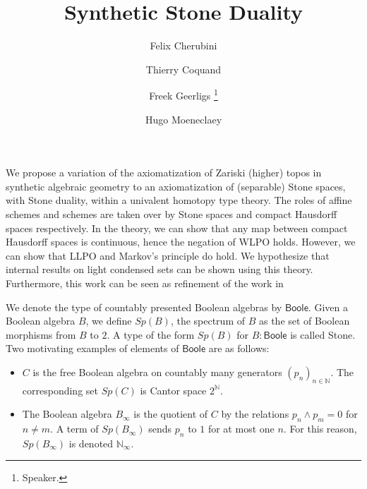 \documentclass[letterpaper]{../../util/easychair}
\title{Synthetic Stone Duality 
}
\author{
Felix Cherubini %
\and 
 Thierry Coquand%
\and 
 Freek Geerligs%
\thanks{Speaker.}%
\and
 Hugo Moeneclaey %
}
\institute{
  University of Gothenburg and Chalmers University of Technology, Gothenburg, Sweden%
}
\newcommand{\N}{\mathbb{N}}
\newcommand{\Boole}{\mathsf{Boole}}
\newcommand{\Noo}{\N_{\infty}}
\begin{document}
\maketitle
We propose a variation of the axiomatization of Zariski (higher) topos in synthetic algebraic geometry \cite{draft}
to an axiomatization of (separable) Stone spaces, with Stone duality, within a univalent homotopy type theory.  
The roles of affine schemes and schemes are taken over by Stone spaces and compact Hausdorff spaces respectively. 
In the theory, we can show that any map between compact Hausdorff spaces is continuous, hence the negation of WLPO holds. 
However, we can show that LLPO and Markov's principle do hold. 
We hypothesize that internal results on light condensed sets \cite{Scholze,TODO} can be shown using this theory. 
Furthermore, this work can be seen as refinement of the work in \cite{XuE13}

\medskip

We denote the type of countably presented Boolean algebras by $\Boole$.
Given a Boolean algebra $B$, we define $Sp(B)$, the spectrum of $B$ as the set of Boolean morphisms from $B$ to $2$.  
A type of the form $Sp(B)$ for $B:\Boole$ is called Stone.
%
Two motivating examples of elements of $\Boole$ are as follows:
 \begin{itemize}
   \item $C$ is the free Boolean algebra on countably many generators $(p_n)_{n\in\mathbb N}$. 
     The corresponding set $Sp(C)$ is Cantor space $2^\mathbb N$. 
   \item 
     The Boolean algebra $ B_\infty$ is %
     the quotient of $C$ by the relations $p_n\wedge p_m = 0$ for $n\neq m$.  
     A term of $Sp(B_\infty)$ sends $p_n$ to $1$ for at most one $n$. 
     For this reason, $Sp(B_\infty)$ is denoted $\Noo$. 
  \end{itemize} 
\end{document}
